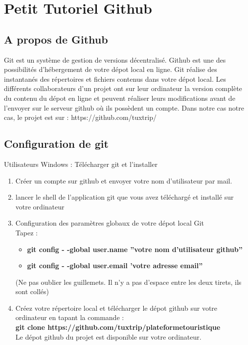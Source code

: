 \documentclass[a4paper, 12pt, openany]{report}
\begin{document}


\chapter*{Petit Tutoriel Github}
\section*{A propos de Github}
Git est un système de gestion de versions décentralisé. Github est  une des possibilités d'hébergement de votre dépot local en ligne. Git réalise des instantanés des répertoires et fichiers contenus dans votre dépot local. Les différents collaborateurs d'un projet ont sur leur ordinateur la version complète du contenu du  dépot en ligne et peuvent réaliser leurs modifications avant de l'envoyer sur le serveur github où ils possèdent un compte. Dans notre  cas notre cas, le projet est sur : https://github.com/tuxtrip/

\section*{Configuration de git}
Utilisateurs Windows : Télécharger git et l'installer \\

\begin{enumerate}
\item Créer un compte sur github et envoyer votre nom d'utilisateur par mail.\\
\item lancer le shell de l'application git que vous avez téléchargé et installé sur votre ordinateur \\
\item Configuration des paramètres globaux de votre dépot local Git\\
Tapez  :
\begin{itemize}
\item  \textbf{git config - -global user.name ''votre nom d'utilisateur github''}
\item  \textbf{git config - -global user.email 'votre adresse email''}
\end{itemize}
(Ne pas oublier les guillemets.  Il n'y a pas d'espace entre les deux tirets, ils sont collés)\\
\item Créez votre répertoire local et télécharger le dépot github sur votre ordinateur en tapant la commande :\\
\textbf{git clone https://github.com/tuxtrip/plateformetouristique} \\
Le dépot github du projet est disponible sur votre ordinateur. 
\end{enumerate}
\end{document}

